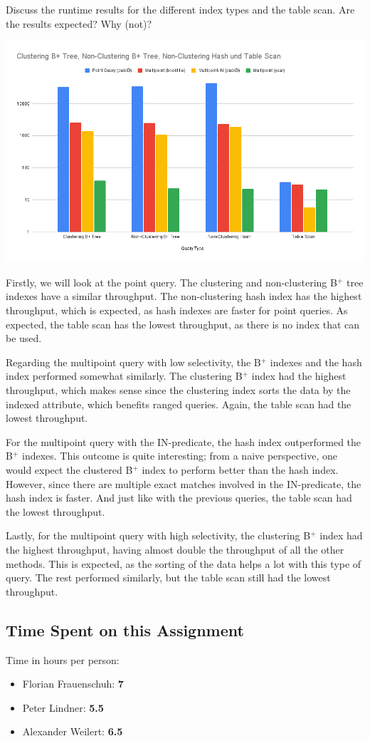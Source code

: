 \documentclass[11pt]{scrartcl}
\begin{document}
Discuss the runtime results for the different index types and the table scan. Are the results expected? Why (not)?

\includegraphics[width=\textwidth]{resources/throughput.png}

Firstly, we will look at the point query.
The clustering and non-clustering B$^+$ tree indexes have a similar throughput.
The non-clustering hash index has the highest throughput, which is expected, as hash indexes are faster for point queries.
As expected, the table scan has the lowest throughput, as there is no index that can be used.

Regarding the multipoint query with low selectivity, the B$^+$ indexes and the hash index performed somewhat similarly.
The clustering B$^+$ index had the highest throughput, which makes sense since the clustering index sorts the data
by the indexed attribute, which benefits ranged queries.
Again, the table scan had the lowest throughput.

For the multipoint query with the IN-predicate, the hash index outperformed the B$^+$ indexes.
This outcome is quite interesting; from a naive perspective, one would expect the clustered B$^+$ index to perform
better than the hash index.
However, since there are multiple exact matches involved in the IN-predicate, the hash index is faster.
And just like with the previous queries, the table scan had the lowest throughput.

Lastly, for the multipoint query with high selectivity, the clustering B$^+$ index had the highest throughput, having
almost double the throughput of all the other methods.
This is expected, as the sorting of the data helps a lot with this type of query.
The rest performed similarly, but the table scan still had the lowest throughput.



\subsection*{Time Spent on this Assignment}

Time in hours per person:

\begin{itemize}
    \item Florian Frauenschuh: \textbf{7}
    \item Peter Lindner: \textbf{5.5}
    \item Alexander Weilert: \textbf{6.5}
\end{itemize}

\printbibliography[title=References]
\end{document}
